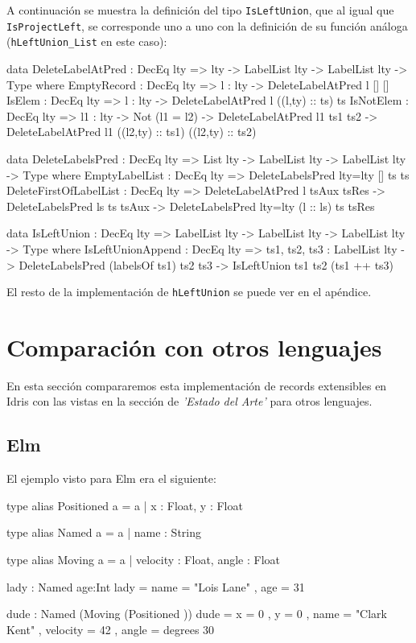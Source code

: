 A continuación se muestra la definición del tipo \texttt{IsLeftUnion}, que al igual que \texttt{IsProjectLeft}, se corresponde uno a uno con la definición de su función análoga (\texttt{hLeftUnion\_List} en este caso):

\begin{code}
data DeleteLabelAtPred : DecEq lty => lty -> LabelList lty -> 
  LabelList lty -> Type where
  EmptyRecord : DecEq lty => {l : lty} -> 
    DeleteLabelAtPred l [] []
  IsElem : DecEq lty => {l : lty} -> 
    DeleteLabelAtPred l ((l,ty) :: ts) ts
  IsNotElem : DecEq lty => {l1 : lty} -> Not (l1 = l2) -> 
    DeleteLabelAtPred l1 ts1 ts2 -> 
    DeleteLabelAtPred l1 ((l2,ty) :: ts1) ((l2,ty) :: ts2)

data DeleteLabelsPred : DecEq lty => List lty -> LabelList lty -> 
  LabelList lty -> Type where
  EmptyLabelList : DecEq lty =>  
    DeleteLabelsPred {lty=lty} [] ts ts
  DeleteFirstOfLabelList : DecEq lty => 
    DeleteLabelAtPred l tsAux tsRes -> 
    DeleteLabelsPred ls ts tsAux ->
    DeleteLabelsPred {lty=lty} (l :: ls) ts tsRes

data IsLeftUnion : DecEq lty => LabelList lty -> LabelList lty -> 
  LabelList lty -> Type where
  IsLeftUnionAppend : DecEq lty => 
    {ts1, ts2, ts3 : LabelList lty} -> 
    DeleteLabelsPred (labelsOf ts1) ts2 ts3 -> 
    IsLeftUnion ts1 ts2 (ts1 ++ ts3)
\end{code}

El resto de la implementación de \texttt{hLeftUnion} se puede ver en el apéndice.

\section{Comparación con otros lenguajes}

En esta sección compararemos esta implementación de records extensibles en Idris con las vistas en la sección de \textit{'Estado del Arte'} para otros lenguajes.

\subsection{Elm}

El ejemplo visto para Elm era el siguiente:

\begin{code}
type alias Positioned a =
  { a | x : Float, y : Float }

type alias Named a =
  { a | name : String }

type alias Moving a =
  { a | velocity : Float, angle : Float }

lady : Named { age:Int }
lady =
  { name = "Lois Lane"
  , age = 31
  }

dude : Named (Moving (Positioned {}))
dude =
  { x = 0
  , y = 0
  , name = "Clark Kent"
  , velocity = 42
  , angle = degrees 30
  }
\end{code}

